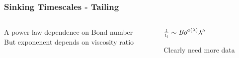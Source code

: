 \documentclass{beamer}
\newcommand\Bo{\mbox{\textit{Bo}}}  %
\begin{document}
\begin{frame}
  \frametitle{Sinking Timescales - Tailing}

  \begin{columns}[t]
    \begin{column}{0.5\paperwidth}
      \centering
      \resizebox{\textwidth}{!}{}

      A power law dependence on Bond number \\
      \vspace{0.5cm}
      But exponenent depends on viscosity ratio \\
      
    \end{column}

    \begin{column}{0.5\paperwidth}
      \centering
      \resizebox{\textwidth}{!}{}
      
      \vspace{1cm}
      $\frac{t}{t_{\text{i}}} \sim \Bo^{a(\lambda)} \lambda^{b}$

      \vspace{1cm}

      Clearly need more data
    \end{column}
  \end{columns}


\end{frame}
\end{document}
